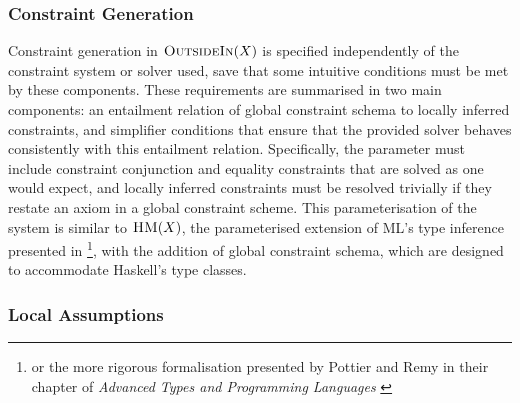\documentclass[a4paper]{jfp}
\newcommand{\outsidein}{\textsc{OutsideIn}(X)}
\begin{document}
\subsubsection{Constraint Generation}

Constraint generation in $\outsidein$ is specified independently of the constraint system or solver used, save that some intuitive conditions must be met by these components. These requirements are summarised in two main components: an entailment relation of global constraint schema to locally inferred constraints, and simplifier conditions that ensure that the provided solver behaves consistently with this entailment relation. Specifically, the parameter must include constraint conjunction and equality constraints that are solved as one would expect, and locally inferred constraints must be resolved trivially if they restate an axiom in a global constraint scheme. This parameterisation of the system is similar to $\textsc{HM}(X)$, the parameterised extension of ML's type inference presented in \cite{Odersky97typeinference}\footnote{or the more rigorous formalisation presented by Pottier and Remy in their chapter of \emph{Advanced Types and Programming Languages} \cite{Pottier:2005ue}}, with the addition of global constraint schema, which are designed to accommodate Haskell's type classes.

\subsubsection{Local Assumptions}
\end{document}
